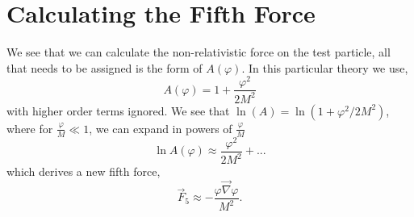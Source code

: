 \section{Calculating the Fifth Force}
We see that we can calculate the non-relativistic force on the test particle, all that needs to be assigned is the form of $A(\varphi)$. In this particular theory we use, 
\begin{equation}
    A(\varphi) = 1 + \frac{\varphi^2}{2M^2}
\end{equation}
with higher order terms ignored. We see that $\ln(A) = \ln(1 + \varphi^2/2M^2)$, where for $\frac{\varphi}{M}\ll 1$, we can expand in powers of $\frac{\varphi}{M}$
\begin{equation}
    \ln A(\varphi)\approx \frac{\varphi^2}{2M^2}+...
\end{equation}
which derives a new fifth force,
\begin{equation}
    \vec{F}_5 \approx - \frac{\varphi\vec{\nabla}\varphi}{M^2}.
\end{equation}



